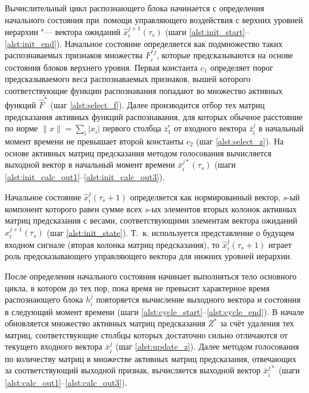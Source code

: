 Вычислительный цикл распознающего блока начинается с определения начального состояния при~помощи управляющего воздействия с верхних уровней иерархии "--- вектора ожиданий $\hat x_i^{j+1}(\tau_s)$ (шаги \ref{alst:init_start}--\ref{alst:init_end}). Начальное состояние определяется как подмножество таких распознаваемых признаков множества $F_i^{*j}$, которые предсказываются на основе состояния блоков верхнего уровня. Первая константа $c_1$ определяет порог предсказываемого веса распознаваемых признаков, вышей которого соответствующие функции распознавания попадают во множество активных функций $\hat F^*$ (шаг \ref{alst:select_f}). Далее производится отбор тех матриц предсказания активных функций распознавания, для которых обычное расстояние по норме $\|x\|=\sum_i |x_i|$ первого столбца $\bar z_1^r$ от входного вектора $\bar z_i^j$ в начальный момент времени не превышает второй константы $c_2$ (шаг \ref{alst:select_z}). На основе активных матриц предсказания методом голосования вычисляется выходной вектор в начальный момент времени $\bar x_i^{j*}(\tau_s)$ (шаги \ref{alst:init_calc_out1}--\ref{alst:init_calc_out3}).
	
Начальное состояние $\hat x_i^j(\tau_s+1)$ определяется как нормированный вектор, $s$-ый компонент которого равен сумме всех $s$-ых элементов вторых колонок активных матриц предсказания с весами, соответствующими элементам вектора ожиданий $\hat x_i^{j+1}(\tau_s)$ (шаг \ref{alst:init_state}). Т.~к. используется представление о будущем входном сигнале (вторая колонка матриц предсказания), то $\hat x_i^j(\tau_s+1)$ играет роль предсказывающего управляющего вектора для нижних уровней иерархии.

После определения начального состояния начинает выполняться тело основного цикла, в котором до тех пор, пока время не превысит характерное время распознающего блока $h_i^j$ повторяется вычисление выходного вектора и состояния в следующий момент времени (шаги \ref{alst:cycle_start}--\ref{alst:cycle_end}). В начале обновляется множество активных матриц предсказания $Z^*$ за счёт удаления тех матриц, соответствующие столбцы которых достаточно сильно отличаются от текущего входного вектора $\bar x_i^j$ (шаг \ref{alst:update_z}). Далее методом голосования по количеству матриц в множестве активных матриц предсказания, отвечающих за соответствующий выходной признак, вычисляется выходной вектор $\bar x_i^{j*}$ (шаги \ref{alst:calc_out1}--\ref{alst:calc_out3}).
		
